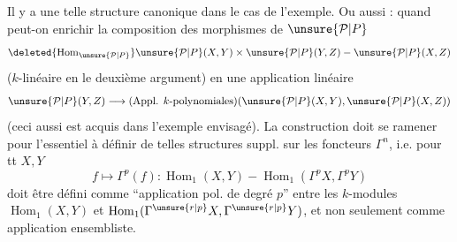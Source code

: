 Il y a une telle structure canonique dans le cas de l'exemple.
Ou aussi : quand peut-on enrichir la composition des morphismes de $\unsure{\mathcal P|P}$
\[\deleted{\operatorname{Hom}_\unsure{\mathcal P|P}}\unsure{\mathcal P|P}(X,Y)\times \unsure{\mathcal P|P}(Y,Z)\mathbin{-}\unsure{\mathcal P|P}(X,Z)\]
($k$-linéaire en le deuxième argument) en une application linéaire
\[\unsure{\mathcal P|P}(Y,Z)\longrightarrow(\text{Appl. }k\text{-polynomiales})(\unsure{\mathcal P|P}(X,Y),\unsure{\mathcal P|P}(X,Z))\]
(ceci aussi est acquis dans l'exemple  envisagé). La construction doit se ramener pour l'essentiel à définir de telles structures suppl. sur les foncteurs $\Gamma^n$, i.e. pour tt $X,Y$
\[f\longmapsto\Gamma^p(f):\operatorname{Hom}_1(X,Y)\mathbin{-}\operatorname{Hom}_1(\Gamma^pX,\Gamma^pY)\]
doit être défini comme ``application pol. de degré $p$'' entre les $k$-modules $\operatorname{Hom}_1(X,Y)$ et $\operatorname{Hom}_1(\Gamma^{\unsure{r|p}}X,\Gamma^{\unsure{r|p}}Y)$, et non seulement comme application ensembliste.

